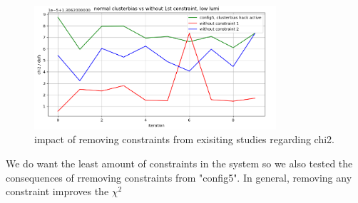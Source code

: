 \begin{figure}
  \centering
  \includegraphics[width=0.8\textwidth]{plots/feb_6_2022/low_lumi_removed_constraints_vs_normal.png}
  \caption{impact of removing constraints from exisiting studies regarding chi2.}
  \label{fig:removeConst}
\end{figure}

We do want the least amount of constraints in the system so we also tested
the consequences of rremoving constraints from "config5". In general, removing
any constraint improves the $\chi^2$

